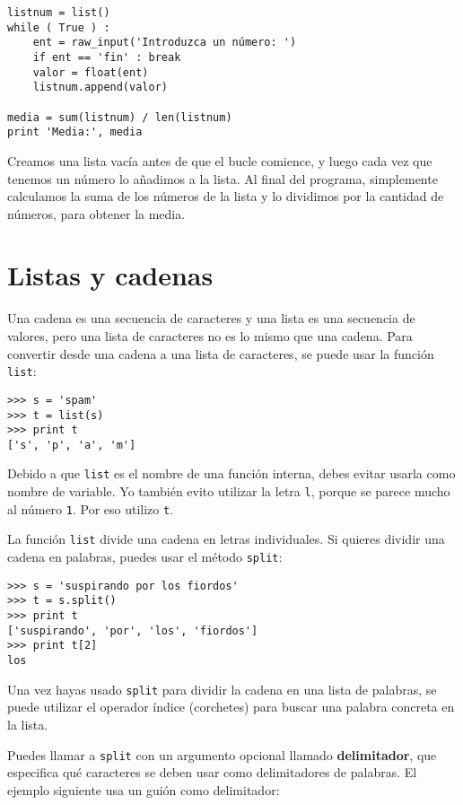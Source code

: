 \beforeverb
\begin{verbatim}
listnum = list()
while ( True ) :
    ent = raw_input('Introduzca un número: ')
    if ent == 'fin' : break
    valor = float(ent)
    listnum.append(valor)

media = sum(listnum) / len(listnum)
print 'Media:', media
\end{verbatim}
\afterverb
%
Creamos una lista vacía antes de que el bucle comience, y luego cada vez
que tenemos un número lo añadimos a la lista. Al final del
programa, simplemente calculamos la suma de los números de la
lista y lo dividimos por la cantidad de números,
para obtener la media.

\section{Listas y cadenas}


Una cadena es una secuencia de caracteres y una lista es una secuencia
de valores, pero una lista de caracteres no es lo mismo que una
cadena. Para convertir desde una cadena a una lista de caracteres,
se puede usar la función {\tt list}:


\beforeverb
\begin{verbatim}
>>> s = 'spam'
>>> t = list(s)
>>> print t
['s', 'p', 'a', 'm']
\end{verbatim}
\afterverb
%
Debido a que {\tt list} es el nombre de una función interna, debes
evitar usarla como nombre de variable. Yo también evito utilizar la letra {\tt l},
porque se parece mucho al número {\tt 1}. Por eso utilizo {\tt t}.

La función {\tt list} divide una cadena en letras individuales. Si
quieres dividir una cadena en palabras, puedes usar el método
{\tt split}:


\beforeverb
\begin{verbatim}
>>> s = 'suspirando por los fiordos'
>>> t = s.split()
>>> print t
['suspirando', 'por', 'los', 'fiordos']
>>> print t[2]
los
\end{verbatim}
\afterverb
%
Una vez hayas usado {\tt split} para dividir la cadena
en una lista de palabras, se puede utilizar el operador índice
(corchetes) para buscar una palabra concreta en la lista.

Puedes llamar a {\tt split} con
un argumento opcional llamado {\bf delimitador}, que
especifica qué caracteres se deben usar como delimitadores de palabras.
El ejemplo siguiente usa un guión como delimitador:


